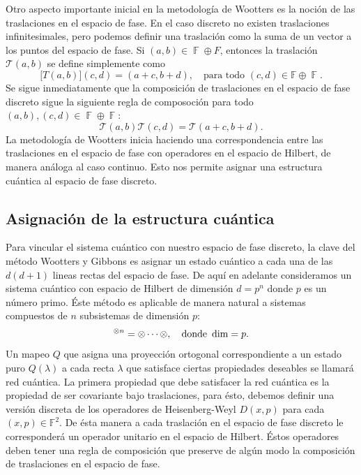 \documentclass[a4paper]{report}
\DeclareMathOperator{\F}{\mathbb{F}}
\let\H\relax
\DeclareMathOperator{\H}{\mathcal H}
\begin{document}
  Otro aspecto importante inicial en la metodología de
  Wootters es la noción de las traslaciones en el espacio de
  fase. En el caso discreto no existen traslaciones
  infinitesimales, pero podemos definir una traslación como
  la suma de un vector a los puntos del espacio de fase. Si
  $(a,b) \in \F \oplus F$, entonces la traslación $\mathcal
  T(a,b)$ se define simplemente como
  \begin{equation}
    \mathcal [T(a,b)](c,d) = (a+c, b+d),
    \quad
    \text{para todo } (c,d) \in \mathbb F \oplus \F.
  \end{equation} 
  Se sigue inmediatamente que la composición de traslaciones
  en el espacio de fase discreto sigue la siguiente regla de
  composoción para todo $(a,b), (c,d) \in \F \oplus \F$:
  \begin{equation}
    \label{eqn:translation_composition}
    \mathcal T(a,b) \mathcal T(c,d)
    = \mathcal T(a+c,b+d).
  \end{equation}
  La metodología de Wootters inicia haciendo una
  correspondencia entre las traslaciones en el espacio de
  fase con operadores en el espacio de Hilbert, de manera
  análoga al caso continuo. Esto nos permite asignar una
  estructura cuántica al espacio de fase discreto.

  \subsection{Asignación de la estructura cuántica}

  Para vincular el sistema cuántico con nuestro espacio de
  fase discreto, la clave del método Wootters y Gibbons es
  asignar un estado cuántico a cada una de las $d(d+1)$
  lineas rectas del espacio de fase. De aquí en adelante
  consideramos un sistema cuántico con espacio de Hilbert de
  dimensión $d = p^{n}$ donde $p$ es un número primo. Éste
  método es aplicable de manera natural a sistemas
  compuestos de $n$ subsistemas de dimensión $p$:
  \begin{equation}
    \H^{\otimes n}
    = \H \otimes \cdots \otimes \H,
    \quad
    \text{donde } \dim\H = p.
  \end{equation}
  Un mapeo $Q$ que asigna
  una proyección ortogonal correspondiente a un estado puro
  $Q(\lambda)$ a cada recta $\lambda$ que satisface ciertas
  propiedades deseables se llamará red
  cuántica. La primera propiedad que debe satisfacer la red
  cuántica es la propiedad de ser covariante bajo
  traslaciones, para ésto, debemos definir una versión
  discreta de los operadores de Heisenberg-Weyl $ D(x,p)$
  para cada $(x,p) \in \mathbb F^2$. De ésta
  manera a cada traslación en el espacio de fase discreto le
  corresponderá un operador unitario en el espacio de
  Hilbert. Éstos operadores deben tener una regla de
  composición que preserve de algún modo la composición de
  traslaciones en el espacio de fase. 
\end{document}

